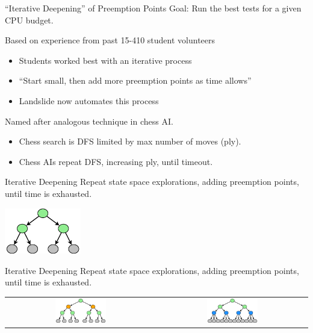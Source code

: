 \documentclass[xcolor=dvipsnames]{beamer}
\begin{document}
\begin{frame}{``Iterative Deepening'' of Preemption Points}
	Goal: Run the best tests for a given CPU budget.
	\linegap

	Based on experience from past 15-410 student volunteers
	\begin{itemize}
		\item Students worked best with an iterative process
		\item ``Start small, then add more preemption points as time allows''
		\item Landslide now automates this process
	\end{itemize}
	\linegap

	Named after analogous technique in chess AI.
	\begin{itemize}
		\item Chess search is DFS limited by max number of moves (ply).
		\item Chess AIs repeat DFS, increasing ply, until timeout.
	\end{itemize}
\end{frame}

\begin{frame}{Iterative Deepening}
	Repeat state space explorations, adding preemption points, until time is exhausted.
	\vspace{0.29in}
	\begin{center}
		\includegraphics[width=0.25\textwidth]{tree0.pdf}
	\end{center}
\end{frame}

\begin{frame}{Iterative Deepening}
	Repeat state space explorations, adding preemption points, until time is exhausted.
	\vspace{0.15in}
	\begin{center}
		\begin{tabular}{cc}
			\includegraphics[width=0.35\textwidth]{tree1.pdf} &
			\includegraphics[width=0.35\textwidth]{tree2.pdf}
		\end{tabular}
	\end{center}
\end{frame}
\end{document}

